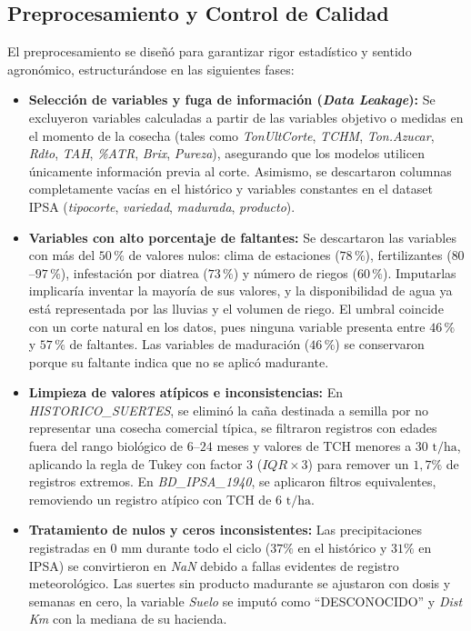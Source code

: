 \documentclass[conference]{IEEEtran}
\begin{document}
\subsection{Preprocesamiento y Control de Calidad}
El preprocesamiento se diseñó para garantizar rigor estadístico y sentido agronómico, estructurándose en las siguientes fases:
\begin{itemize}
    \item \textbf{Selección de variables y fuga de información (\textit{Data Leakage}):} Se excluyeron variables calculadas a partir de las variables objetivo o medidas en el momento de la cosecha (tales como \textit{TonUltCorte}, \textit{TCHM}, \textit{Ton.Azucar}, \textit{Rdto}, \textit{TAH}, \textit{\%ATR}, \textit{Brix}, \textit{Pureza}), asegurando que los modelos utilicen únicamente información previa al corte. Asimismo, se descartaron columnas completamente vacías en el histórico y variables constantes en el dataset IPSA (\textit{tipocorte}, \textit{variedad}, \textit{madurada}, \textit{producto}).
    \item \textbf{Variables con alto porcentaje de faltantes:} Se descartaron las variables con más del $50\,\%$ de valores nulos: clima de estaciones ($78\,\%$), fertilizantes ($80$--$97\,\%$), infestación por diatrea ($73\,\%$) y número de riegos ($60\,\%$). Imputarlas implicaría inventar la mayoría de sus valores, y la disponibilidad de agua ya está representada por las lluvias y el volumen de riego. El umbral coincide con un corte natural en los datos, pues ninguna variable presenta entre $46\,\%$ y $57\,\%$ de faltantes. Las variables de maduración ($46\,\%$) se conservaron porque su faltante indica que no se aplicó madurante.
    \item \textbf{Limpieza de valores atípicos e inconsistencias:} En \textit{HISTORICO\_SUERTES}, se eliminó la caña destinada a semilla por no representar una cosecha comercial típica, se filtraron registros con edades fuera del rango biológico de $6$--$24$ meses y valores de TCH menores a $30\text{ t/ha}$, aplicando la regla de Tukey con factor $3$ ($IQR \times 3$) para remover un $1,7\%$ de registros extremos. En \textit{BD\_IPSA\_1940}, se aplicaron filtros equivalentes, removiendo un registro atípico con TCH de $6\text{ t/ha}$.
    \item \textbf{Tratamiento de nulos y ceros inconsistentes:} Las precipitaciones registradas en $0\text{ mm}$ durante todo el ciclo ($37\%$ en el histórico y $31\%$ en IPSA) se convirtieron en \textit{NaN} debido a fallas evidentes de registro meteorológico. Las suertes sin producto madurante se ajustaron con dosis y semanas en cero, la variable \textit{Suelo} se imputó como ``DESCONOCIDO'' y \textit{Dist Km} con la mediana de su hacienda.

\end{itemize}
\end{document}
